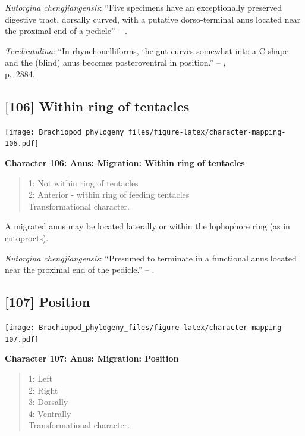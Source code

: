\documentclass[]{book}
\theoremstyle{definition}
\theoremstyle{definition}
\theoremstyle{definition}
\theoremstyle{remark}
\begin{document}
\emph{Kutorgina chengjiangensis}: ``Five specimens have an exceptionally
preserved digestive tract, dorsally curved, with a putative
dorso-terminal anus located near the proximal end of a pedicle'' --
\citet{Zhang2007Rhynchonelliformeanbrachiopods}.

\emph{Terebratulina}: ``In rhynchonelliforms, the gut curves somewhat
into a C-shape and the (blind) anus becomes posteroventral in
position.'' -- \citet{Williams2007PartH},\\
p.~2884.

\hypertarget{within-ring-of-tentacles}{%
\subsection*{{[}106{]} Within ring of
tentacles}\label{within-ring-of-tentacles}}

\texttt{[image: Brachiopod\_phylogeny\_files/figure-latex/character-mapping-106.pdf]}

\textbf{Character 106: Anus: Migration: Within ring of tentacles}

\begin{quote}
1: Not within ring of tentacles\\
2: Anterior - within ring of feeding tentacles\\
Transformational character.
\end{quote}

A migrated anus may be located laterally or within the lophophore ring
(as in entoprocts).

\emph{Kutorgina chengjiangensis}: ``Presumed to terminate in a
functional anus located near the proximal end of the pedicle.'' --
\citet{Zhang2007Rhynchonelliformeanbrachiopods}.

\hypertarget{position}{%
\subsection*{{[}107{]} Position}\label{position}}

\texttt{[image: Brachiopod\_phylogeny\_files/figure-latex/character-mapping-107.pdf]}

\textbf{Character 107: Anus: Migration: Position}

\begin{quote}
1: Left\\
2: Right\\
3: Dorsally\\
4: Ventrally\\
Transformational character.
\end{quote}
\end{document}
